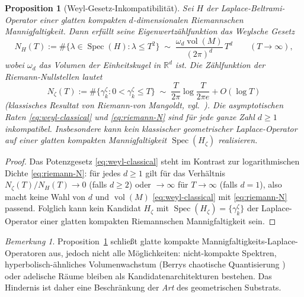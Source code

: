 \documentclass[11pt]{article}
\newtheorem{proposition}[theorem]{Proposition}
\theoremstyle{definition}
\theoremstyle{remark}
\newtheorem{remark}[theorem]{Bemerkung}
\newcommand{\Spec}{\operatorname{Spec}}
\begin{document}
\begin{proposition}[Weyl-Gesetz-Inkompatibilität]\label{prop:weyl-obstruction}
Sei $H$ der Laplace-Beltrami-Operator einer glatten kompakten
$d$-dimensionalen Riemannschen Mannigfaltigkeit. Dann erfüllt seine Eigenwertzählfunktion
das Weylsche Gesetz
\begin{equation}
\label{eq:weyl-classical}
  N_H(T) := \#\{\lambda \in \Spec(H) : \lambda \leq T^2\}
  \;\sim\; \frac{\omega_d \operatorname{vol}(M)}{(2\pi)^d}\,T^d
  \qquad (T \to \infty),
\end{equation}
wobei $\omega_d$ das Volumen der Einheitskugel in $\mathbb{R}^d$ ist. Die
Zählfunktion der Riemann-Nullstellen lautet
\begin{equation}
\label{eq:riemann-N}
  N_\zeta(T) := \#\{\gamma_k^\zeta : 0 < \gamma_k^\zeta \leq T\}
  \;\sim\; \frac{T}{2\pi}\log\!\frac{T}{2\pi e} + O(\log T)
\end{equation}
(klassisches Resultat von Riemann-von Mangoldt, vgl.\ \cite[\S9.4]{Titchmarsh1986}).
Die asymptotischen Raten \eqref{eq:weyl-classical} und
\eqref{eq:riemann-N} sind für jede ganze Zahl $d \geq 1$ inkompatibel.
Insbesondere kann kein klassischer geometrischer Laplace-Operator auf einer glatten kompakten
Mannigfaltigkeit $\Spec(H_\zeta)$ realisieren.
\end{proposition}

\begin{proof}
Das Potenzgesetz \eqref{eq:weyl-classical} steht im Kontrast zur
logarithmischen Dichte \eqref{eq:riemann-N}: für jedes $d \geq 1$ gilt für
das Verhältnis $N_\zeta(T) / N_H(T) \to 0$ (falls $d \geq 2$) oder $\to \infty$ für
$T \to \infty$ (falls $d = 1$), also macht keine Wahl von $d$ und $\operatorname{vol}(M)$
\eqref{eq:weyl-classical} mit \eqref{eq:riemann-N} passend.
Folglich kann kein Kandidat $H_\zeta$ mit
$\Spec(H_\zeta) = \{\gamma_k^\zeta\}$ der Laplace-Operator einer
glatten kompakten Riemannschen Mannigfaltigkeit sein.
\end{proof}

\begin{remark}\label{rem:weyl-workarounds}
Proposition~\ref{prop:weyl-obstruction} schließt glatte kompakte
Mannigfaltigkeits-Laplace-Operatoren aus, jedoch nicht alle Möglichkeiten: nicht-kompakte Spektren,
hyperbolisch-ähnliches Volumenwachstum (Berrys chaotische Quantisierung
\cite{Berry1985, BerryKeating1999}) oder adelische Räume
\cite{Connes1999, Connes2026} bleiben als Kandidatenarchitekturen bestehen. Das
Hindernis ist daher eine Beschränkung der \emph{Art} des
geometrischen Substrats.
\end{remark}
\end{document}
